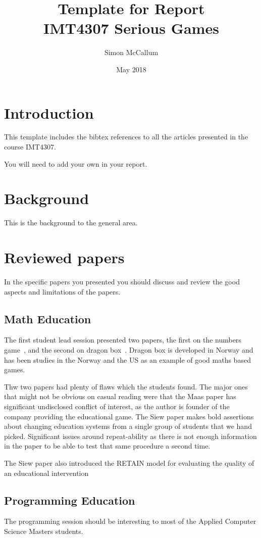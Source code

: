 \documentclass{article}
\title{Template for Report \\IMT4307 Serious Games}
\author{Simon McCallum}
\date{May 2018}
\begin{document}
\maketitle

\section{Introduction}
This template includes the bibtex references to all the articles presented in the course IMT4307.

You will need to add your own in your report.

\section{Background}

This is the background to the general area.

\section{Reviewed papers}

In the specific papers you presented you should discuss and review the good aspects and limitations of the papers.

\subsection{Math Education}
The first student lead session presented two papers, the first on the numbers game~\cite{maas2017cognitive}, and the second on dragon box~\cite{siew2016students}.  Dragon box is developed in Norway and has been studies in the Norway and the US as an example of good maths based games. 

Thw two papers had plenty of flaws which the students found.  The major ones that might not be obvious on casual reading were that the Maas paper has significant undisclosed conflict of interest, as the author is founder of the company providing the educational game. The Siew paper makes bold assertions about changing education systems from a single group of students that we hand picked. Significant issues around repeat-ability as there is not enough information in the paper to be able to test that same procedure a second time. 

The Siew paper also introduced the RETAIN model for evaluating the quality of an educational intervention

\subsection{Programming Education}
The programming session should be interesting to most of the Applied Computer Science Masters students. 
\end{document}
